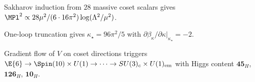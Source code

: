 \begin{theorem}\label{thm:planck}
Sakharov induction from $28$ massive coset scalars gives
$\MPl^2\propto 28\mu^2/(6\cdot16\pi^2)\log(\Lambda^2/\mu^2)$.
\end{theorem}

\begin{theorem}\label{thm:kappa}
One-loop truncation gives $\kappa_\star=96\pi^2/5$ with
$\partial\beta_\kappa/\partial\kappa|_{\kappa_\star}=-2$.
\end{theorem}

\begin{conjecture}\label{conj:breaking}
Gradient flow of $V$ on coset directions triggers
$\E{6}\to\Spin(10)\times U(1)\to\cdots\to SU(3)_c\times U(1)_{\mathrm{em}}$
with Higgs content $\mathbf{45}_H$, $\mathbf{126}_H$, $\mathbf{10}_H$.
\end{conjecture}